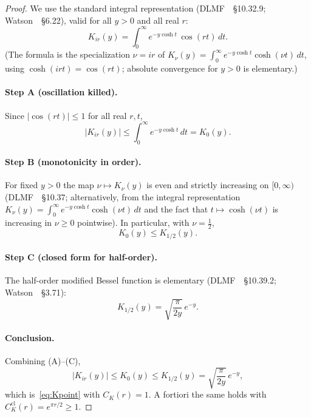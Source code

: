 \documentclass[11pt]{amsart}
\theoremstyle{definition}
\newcommand{\abs}[1]{\lvert#1\rvert}
\begin{document}
\begin{proof}
We use the standard integral representation
(DLMF~\cite{DLMF}~\S10.32.9; Watson~\cite{Watson}~\S6.22), valid for all
$y>0$ and all real $r$:
\begin{equation}
\label{eq:Kint}
  K_{ir}(y)
  =
  \int_0^\infty e^{-y\cosh t}\,\cos(rt)\,dt.
\end{equation}
(The formula is the specialization $\nu=ir$ of
$K_\nu(y)=\int_0^\infty e^{-y\cosh t}\cosh(\nu t)\,dt$, using
$\cosh(irt)=\cos(rt)$; absolute convergence for $y>0$ is elementary.)

\paragraph{Step A (oscillation killed).}
Since $\abs{\cos(rt)}\le 1$ for all real $r,t$,
\begin{equation}
\label{eq:KA}
  \abs{K_{ir}(y)}
  \le
  \int_0^\infty e^{-y\cosh t}\,dt
  =
  K_0(y).
  \tag{A}
\end{equation}

\paragraph{Step B (monotonicity in order).}
For fixed $y>0$ the map $\nu\mapsto K_\nu(y)$ is even and strictly
increasing on $[0,\infty)$ (DLMF~\cite{DLMF}~\S10.37; alternatively, from
the integral representation
$K_\nu(y)=\int_0^\infty e^{-y\cosh t}\cosh(\nu t)\,dt$ and the fact that
$t\mapsto\cosh(\nu t)$ is increasing in $\nu\ge 0$ pointwise).  In
particular, with $\nu=\tfrac12$,
\begin{equation}
\label{eq:KB}
  K_0(y)
  \le
  K_{1/2}(y).
  \tag{B}
\end{equation}

\paragraph{Step C (closed form for half-order).}
The half-order modified Bessel function is elementary
(DLMF~\cite{DLMF}~\S10.39.2; Watson~\cite{Watson}~\S3.71):
\begin{equation}
\label{eq:KC}
  K_{1/2}(y)
  =
  \sqrt{\frac{\pi}{2y}}\,e^{-y}.
  \tag{C}
\end{equation}

\paragraph{Conclusion.}
Combining (A)--(C),
\[
  \abs{K_{ir}(y)}
  \le
  K_0(y)
  \le
  K_{1/2}(y)
  =
  \sqrt{\frac{\pi}{2y}}\,e^{-y},
\]
which is~\eqref{eq:Kpoint} with $C_K(r)=1$.  A fortiori the same holds
with $C_K^{\mathrm{cl}}(r)=e^{\pi r/2}\ge 1$.


\end{proof}
\end{document}
